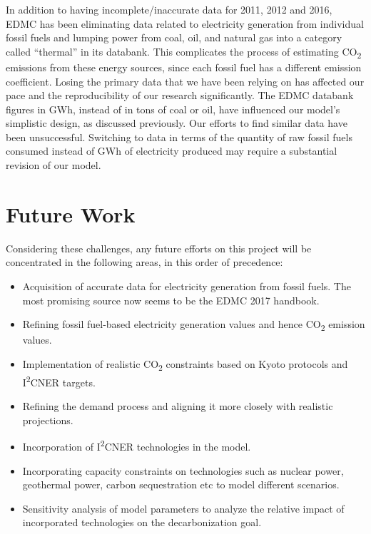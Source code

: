 \documentclass[14pt,a4paper]{article} %
\begin{document}
In addition to having incomplete/inaccurate data for 2011, 2012 and 2016, EDMC has been eliminating data related to electricity generation from individual fossil fuels and lumping power from coal, oil, and natural gas into a category called “thermal” in its databank. This complicates the process of estimating CO\textsubscript{2} emissions from these energy sources, since each fossil fuel has a different emission coefficient. Losing the primary data that we have been relying on has affected our pace and the reproducibility of our research significantly. The EDMC databank figures in GWh, instead of in tons of coal or oil, have influenced our model’s simplistic design, as discussed previously. Our efforts to find similar data have been unsuccessful. Switching to data in terms of the quantity of raw fossil fuels consumed instead of GWh of electricity produced may require a substantial revision of our model. 

\section{Future Work} 
Considering these challenges, any future efforts on this project will be concentrated in the following areas, in this order of precedence:

\begin{itemize}

\item Acquisition of accurate data for electricity generation from fossil fuels. The most promising source now seems to be the EDMC 2017 handbook.

\item Refining fossil fuel-based electricity generation values and hence CO\textsubscript{2} emission values.

\item Implementation of realistic CO\textsubscript{2} constraints based on Kyoto protocols and I\textsuperscript{2}CNER targets.

\item Refining the demand process and aligning it more closely with realistic projections.

\item Incorporation of I\textsuperscript{2}CNER technologies in the model.

\item Incorporating capacity constraints on technologies such as nuclear power, geothermal power, carbon sequestration etc to model different scenarios.

\item Sensitivity analysis of model parameters to analyze the relative impact of incorporated technologies on the decarbonization goal.

\end{itemize}
\end{document}

